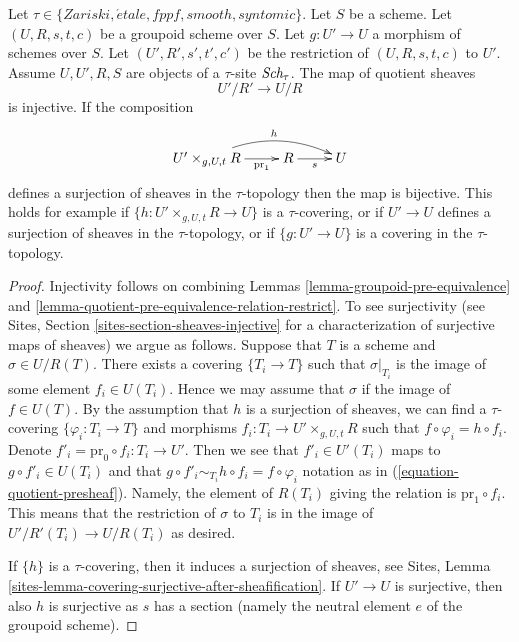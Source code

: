\begin{lemma}
\label{lemma-quotient-groupoid-restrict}
Let $\tau \in \{Zariski, \acute{e}tale, fppf, smooth, syntomic\}$.
Let $S$ be a scheme.
Let $(U, R, s, t, c)$ be a groupoid scheme over $S$.
Let $g : U' \to U$ a morphism of schemes over $S$.
Let $(U', R', s', t', c')$ be the restriction of $(U, R, s, t, c)$ to $U'$.
Assume  $U, U', R, S$ are objects of a $\tau$-site $\textit{Sch}_\tau$.
The map of quotient sheaves
$$
U'/R' \longrightarrow U/R
$$
is injective. If the composition
$$
\xymatrix{
U' \times_{g, U, t} R \ar[r]_-{\text{pr}_1} \ar@/^3ex/[rr]^h
& R \ar[r]_s & U
}
$$
defines a surjection of sheaves in the $\tau$-topology  then
the map is bijective. This holds for example if
$\{h : U' \times_{g, U, t} R \to U\}$ is a $\tau$-covering, or
if $U' \to U$ defines a surjection of sheaves in the $\tau$-topology, or if
$\{g : U' \to U\}$ is a covering in the $\tau$-topology.
\end{lemma}

\begin{proof}
Injectivity follows on combining
Lemmas \ref{lemma-groupoid-pre-equivalence} and
\ref{lemma-quotient-pre-equivalence-relation-restrict}.
To see surjectivity (see
Sites, Section \ref{sites-section-sheaves-injective}
for a characterization of surjective maps of sheaves) we argue as follows.
Suppose that $T$ is a scheme and $\sigma \in U/R(T)$.
There exists a covering $\{T_i \to T\}$ such that $\sigma|_{T_i}$
is the image of some element $f_i \in U(T_i)$. Hence we
may assume that $\sigma$ if the image of $f \in U(T)$.
By the assumption that $h$ is a surjection of sheaves, we
can find a $\tau$-covering $\{\varphi_i : T_i \to T\}$ and morphisms
$f_i : T_i \to U' \times_{g, U, t} R$ such that
$f \circ \varphi_i = h \circ f_i$. Denote
$f'_i = \text{pr}_0 \circ f_i : T_i \to U'$. Then we see that
$f'_i \in U'(T_i)$ maps to $g \circ f'_i \in U(T_i)$ and
that $g \circ f'_i \sim_{T_i} h \circ f_i = f \circ \varphi_i$
notation as in (\ref{equation-quotient-presheaf}). Namely, the
element of $R(T_i)$ giving the relation is $\text{pr}_1 \circ f_i$.
This means that the restriction
of $\sigma$ to $T_i$ is in the image of $U'/R'(T_i) \to U/R(T_i)$
as desired.

\medskip\noindent
If $\{h\}$ is a $\tau$-covering, then it induces a surjection of sheaves, see
Sites, Lemma \ref{sites-lemma-covering-surjective-after-sheafification}.
If $U' \to U$ is surjective, then also $h$ is surjective as $s$ has a section
(namely the neutral element $e$ of the groupoid scheme).
\end{proof}


















